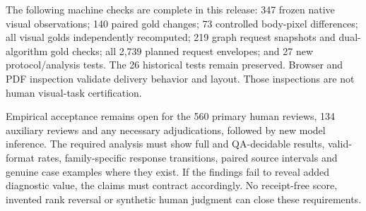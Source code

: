 \documentclass[10pt,twocolumn,letterpaper]{article}
\begin{document}
The following machine checks are complete in this release:
347 frozen native visual observations; 140 paired gold changes;
73 controlled body-pixel differences; all visual golds independently
recomputed; 219 graph request snapshots and dual-algorithm gold checks;
all 2,739 planned request envelopes; and 27 new protocol/analysis tests.
The 26 historical tests remain preserved. Browser and PDF inspection
validate delivery behavior and layout. Those inspections are not
human visual-task certification.

Empirical acceptance remains open for the 560 primary human reviews,
134 auxiliary reviews and any necessary adjudications, followed by
new model inference. The required analysis must show full and
QA-decidable results, valid-format rates, family-specific response
transitions, paired source intervals and genuine case examples where
they exist. If the findings fail to reveal added diagnostic value,
the claims must contract accordingly. No receipt-free score,
invented rank reversal or synthetic human judgment can close these
requirements.
\end{document}
